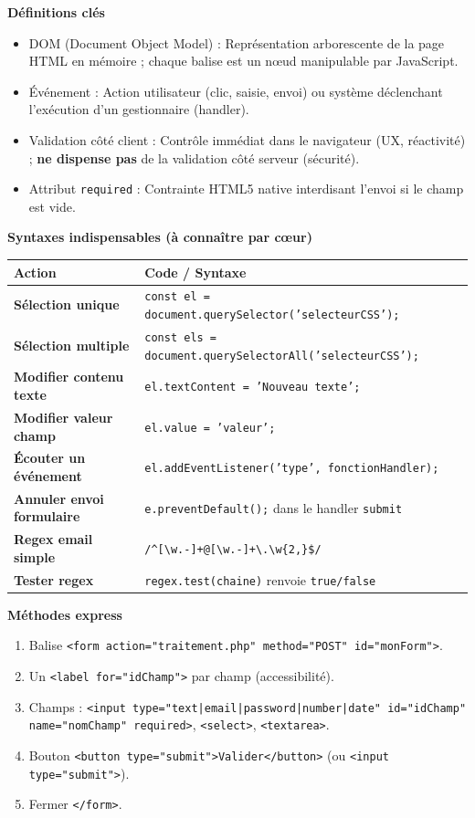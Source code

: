 \documentclass[11pt]{article}
\newcommand{\cle}[1]{{\popxbold\color{popdark}#1}}
\begin{document}
\begin{bilan}
\textbf{Définitions clés}
\begin{itemize}
    \item \cle{DOM (Document Object Model)} : Représentation arborescente de la page HTML en mémoire ; chaque balise est un nœud manipulable par JavaScript.
    \item \cle{Événement} : Action utilisateur (clic, saisie, envoi) ou système déclenchant l'exécution d'un gestionnaire (handler).
    \item \cle{Validation côté client} : Contrôle immédiat dans le navigateur (UX, réactivité) ; \textbf{ne dispense pas} de la validation côté serveur (sécurité).
    \item \cle{Attribut \texttt{required}} : Contrainte HTML5 native interdisant l'envoi si le champ est vide.
\end{itemize}

\textbf{Syntaxes indispensables (à connaître par cœur)}
\begin{center}
\begin{tabularx}{\linewidth}{|>{\bfseries}l|X|}\hline
\textbf{Action} & \textbf{Code / Syntaxe} \\\hline
Sélection unique & \texttt{const el = document.querySelector('selecteurCSS');} \\\hline
Sélection multiple & \texttt{const els = document.querySelectorAll('selecteurCSS');} \\\hline
Modifier contenu texte & \texttt{el.textContent = 'Nouveau texte';} \\\hline
Modifier valeur champ & \texttt{el.value = 'valeur';} \\\hline
Écouter un événement & \texttt{el.addEventListener('type', fonctionHandler);} \\\hline
Annuler envoi formulaire & \texttt{e.preventDefault();} dans le handler \texttt{submit} \\\hline
Regex email simple & \verb|/^[\w.-]+@[\w.-]+\.\w{2,}$/| \\\hline
Tester regex & \texttt{regex.test(chaine)} renvoie \texttt{true/false} \\\hline
\end{tabularx}
\end{center}

\textbf{Méthodes express}
\begin{methode}
\begin{enumerate}
    \item Balise \texttt{<form action="traitement.php" method="POST" id="monForm">}.
    \item Un \texttt{<label for="idChamp">} par champ (accessibilité).
    \item Champs : \texttt{<input type="text|email|password|number|date" id="idChamp" name="nomChamp" required>}, \texttt{<select>}, \texttt{<textarea>}.
    \item Bouton \texttt{<button type="submit">Valider</button>} (ou \texttt{<input type="submit">}).
    \item Fermer \texttt{</form>}.
\end{enumerate}
\end{methode}


\end{bilan}
\end{document}

